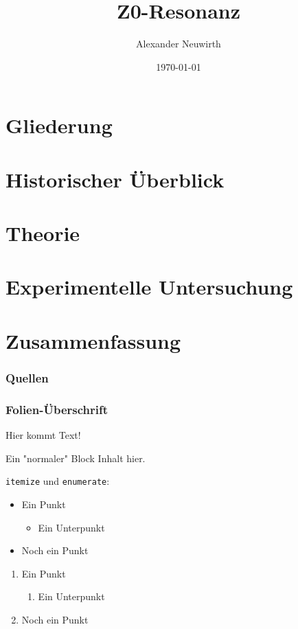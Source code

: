 \documentclass[german, ngerman,tikz]{beamer}
\title[Z0 Resonanz]{Z0-Resonanz} %
\author{Alexander Neuwirth}
\date{\today}
\begin{document}
\begin{frame}
	\titlepage
\end{frame}

\section*{Gliederung}
\begin{frame}
\frametitle{\secname}
\tableofcontents[hideallsubsections]
\end{frame}


\section{Historischer Überblick}


\section{Theorie}

\section{Experimentelle Untersuchung}

\section{Zusammenfassung}


\begin{frame}[allowframebreaks]
	\frametitle{Quellen}
	
	\printbibliography[heading=none]
\end{frame}

\begin{frame}
	\frametitle{Folien-Überschrift}
	
	Hier kommt Text!

	\begin{block}{Ein "normaler" Block}
		Inhalt hier.
	\end{block}

	\texttt{itemize} und \texttt{enumerate}:
	\begin{itemize}
		\item Ein Punkt
		\begin{itemize}
			\item Ein Unterpunkt
		\end{itemize}
		\item Noch ein Punkt
	\end{itemize}
	\begin{enumerate}
		\item Ein Punkt
		\begin{enumerate}
			\item Ein Unterpunkt
		\end{enumerate}
		\item Noch ein Punkt
	\end{enumerate}
\end{frame}
\end{document}
